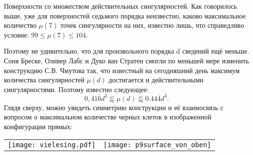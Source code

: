 \begin{surferPage}[216 Синг.]{Поверхности со множеством действительных сингулярностей.}
    Как говорилось выше, уже для поверхностей седьмого порядка неизвестно, каково максимальное количество $\mu(7)$ точек сингулярности на них, известно лишь, что справедливо условие: $99\le \mu(7) \le 104$. 

Поэтому не удивительно, что для произвольного порядка d сведений ещё меньше. Соня Бреске, Оливер Лабс и Дуко ван Стратен смогли по меньшей мере изменить конструкцию С.В. Чмутова так, что известный на сегодняшний день максимум количества сингулярностей $\mu(d)$ достигается и действительными сингулярностями. Поэтому известно следующее: 
    \[0,41\bar{6}d^3 \lessapprox \mu(d) \lessapprox 0.44\bar{4} d^3.\]
Глядя сверху, можно увидеть симметрию конструкции и её взаимосвязь с вопросом о максимальном количестве черных клеток в изображенной конфигурации прямых:
    \begin{center}
      \begin{tabular}{c@{\qquad}c}
        \texttt{[image: vielesing.pdf]}
        &
        \texttt{[image: p9surface\_von\_oben]}
      \end{tabular}
    \end{center}
\end{surferPage}
